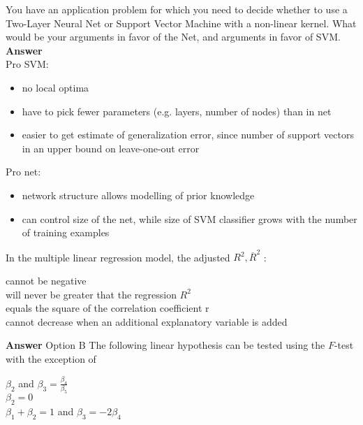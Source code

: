 \documentclass[12pt]{exam}
\begin{document}
\begin{questions}
\question[4] You have an application problem for which you need to decide whether to use a Two-Layer Neural Net or Support Vector Machine with a non-linear kernel. What would be your arguments in favor of the Net, and arguments in favor of SVM.\\
\textbf{Answer} \\
Pro SVM:
\begin{itemize}
    \item no local optima
    \item have to pick fewer parameters (e.g. layers, number of nodes) than in net
    \item easier to get estimate of generalization error, since number of support vectors in an upper bound on leave-one-out error
\end{itemize}
Pro net:
\begin{itemize}
    \item network structure allows modelling of prior knowledge
    \item can control size of the net, while size of SVM classifier grows with the number of training examples
\end{itemize}
\question[1] In the multiple linear regression model, the adjusted $R^2, \overline R^2 $ : \\
\begin{oneparchoices}
\choice cannot be negative \\
\choice will never be greater that the regression $R^2$ \\
\choice equals the square of the correlation coefficient r \\
\choice cannot decrease when an additional explanatory variable is added \\
\end{oneparchoices}
\textbf{Answer} Option B
\question[2] The following linear hypothesis can be tested using the $F$-test with the exception of \\
\begin{oneparchoices}
\choice $\beta_2$ and $\beta_3 =  \frac{\beta_4}{\beta_5}$ \\
\choice $\beta_2 = 0$ \\
\choice $\beta_1 + \beta_2 =  1$ and $\beta_3 = -2 \beta_4$ \\

\end{oneparchoices}
\end{questions}
\end{document}
